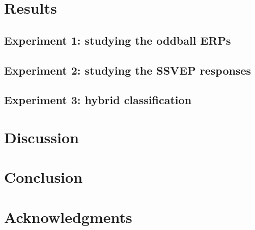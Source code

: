 \documentclass[10pt]{article}
\begin{document}
\section{Results}
\label{sec:3Results}

    \subsection{Experiment 1: studying the oddball ERPs}
    \label{sec:2.2Oddball}


    \subsection{Experiment 2: studying the \ac{SSVEP} responses}
    \label{sec:2.3SSVEP}


    \subsection{Experiment 3: hybrid classification}
    \label{sec:2.4Hybrid}


\section{Discussion}
\label{sec:4Discuss}

\section{Conclusion}
\label{sec:6Conclusion}

\section*{Acknowledgments}

\printbibliography

%



\end{document}
